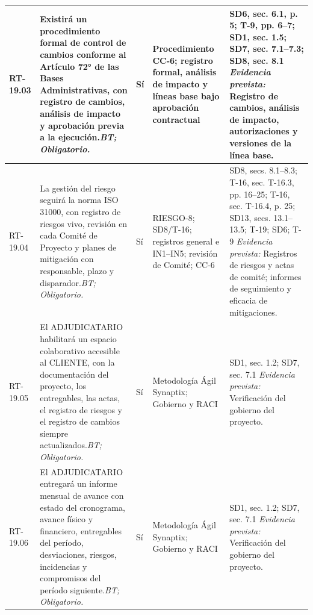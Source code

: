 \begin{paginaHorizontalSynaptix}
\begin{longtable}{|L{0.09\AnchoMatrizTDoce}|L{0.385\AnchoMatrizTDoce}|L{0.065\AnchoMatrizTDoce}|L{0.18\AnchoMatrizTDoce}|L{0.28\AnchoMatrizTDoce}|}
RT-\allowbreak{}19.\allowbreak{}03 &
Existirá un procedimiento formal de control de cambios conforme al Artículo 72° de las Bases Administrativas, con registro de cambios, análisis de impacto y aprobación previa a la ejecución.\newline\textit{BT; Obligatorio.} &
Sí &
Procedimiento CC-6; registro formal, análisis de impacto y líneas base bajo aprobación contractual &
SD6, sec. 6.1, p. 5; T-9, pp. 6--7; SD1, sec. 1.5; SD7, sec. 7.1--7.3; SD8, sec. 8.1 \newline\textit{Evidencia prevista:} Registro de cambios, análisis de impacto, autorizaciones y versiones de la línea base. \\ \hline

RT-\allowbreak{}19.\allowbreak{}04 &
La gestión del riesgo seguirá la norma ISO 31000, con registro de riesgos vivo, revisión en cada Comité de Proyecto y planes de mitigación con responsable, plazo y disparador.\newline\textit{BT; Obligatorio.} &
Sí &
RIESGO-8; SD8/T-16; registros general e IN1--IN5; revisión de Comité; CC-6 &
SD8, secs. 8.1--8.3; T-16, sec. T-16.3, pp. 16--25; T-16, sec. T-16.4, p. 25; SD13, secs. 13.1--13.5; T-19; SD6; T-9 \newline\textit{Evidencia prevista:} Registros de riesgos y actas de comité; informes de seguimiento y eficacia de mitigaciones. \\ \hline

RT-\allowbreak{}19.\allowbreak{}05 &
El ADJUDICATARIO habilitará un espacio colaborativo accesible al CLIENTE, con la documentación del proyecto, los entregables, las actas, el registro de riesgos y el registro de cambios siempre actualizados.\newline\textit{BT; Obligatorio.} &
Sí &
Metodología Ágil Synaptix; Gobierno y RACI &
SD1, sec. 1.2; SD7, sec. 7.1 \newline\textit{Evidencia prevista:} Verificación del gobierno del proyecto. \\ \hline

RT-\allowbreak{}19.\allowbreak{}06 &
El ADJUDICATARIO entregará un informe mensual de avance con estado del cronograma, avance físico y financiero, entregables del período, desviaciones, riesgos, incidencias y compromisos del período siguiente.\newline\textit{BT; Obligatorio.} &
Sí &
Metodología Ágil Synaptix; Gobierno y RACI &
SD1, sec. 1.2; SD7, sec. 7.1 \newline\textit{Evidencia prevista:} Verificación del gobierno del proyecto. \\ \hline


\end{longtable}
\end{paginaHorizontalSynaptix}
